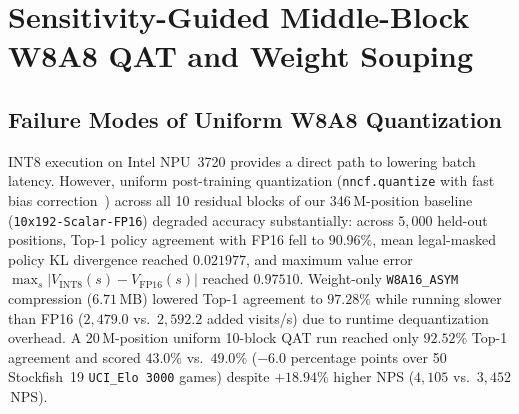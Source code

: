 \documentclass[10pt,twocolumn]{article}
\begin{document}
\section{Sensitivity-Guided Middle-Block W8A8 QAT and Weight Souping}
\label{sec:qat}

\subsection{Failure Modes of Uniform W8A8 Quantization}
INT8 execution on Intel NPU~3720 provides a direct path to lowering batch latency. However, uniform post-training quantization (\texttt{nncf.quantize} with fast bias correction~\cite{nagel2020adaround,openvino2024}) across all 10 residual blocks of our 346\,M-position baseline (\texttt{10x192-Scalar-FP16}) degraded accuracy substantially: across $5{,}000$ held-out positions, Top-1 policy agreement with FP16 fell to $90.96\%$, mean legal-masked policy KL divergence reached $0.021977$, and maximum value error $\max_s |V_{\mathrm{INT8}}(s) - V_{\mathrm{FP16}}(s)|$ reached $0.97510$. Weight-only \texttt{W8A16\_ASYM} compression ($6.71$\,MB) lowered Top-1 agreement to $97.28\%$ while running slower than FP16 ($2{,}479.0$ vs.\ $2{,}592.2$ added visits/s) due to runtime dequantization overhead. A 20\,M-position uniform 10-block QAT run reached only $92.52\%$ Top-1 agreement and scored $43.0\%$ vs.\ $49.0\%$ ($-6.0$ percentage points over 50 Stockfish~19 \texttt{UCI\_Elo 3000} games) despite $+18.94\%$ higher NPS ($4{,}105$ vs.\ $3{,}452$\,NPS).
\end{document}
